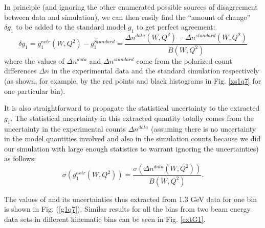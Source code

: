 



In principle (and ignoring the other enumerated possible sources of disagreement between data and simulation), we can then easily find the ``amount of change'' $\delta g_1$ to be added to the standard model $g_1$ to get perfect agreement:
\begin{equation}
\label{g1Ext}
\delta g_1 = g_1^{extr}(W,Q^2) - g_1^{Standard} = \frac{\Delta n^{data}(W,Q^2) - \Delta n^{standard}(W,Q^2)}{B(W,Q^2) }
\end{equation}
where the values of $\Delta n^{data}$ and $\Delta n^{standard}$ come from the polarized count differences $\Delta n$ in the experimental data and the standard simulation respectively (as shown, for example, by the red points and black histograms in Fig. \ref{xs1q7} for one particular \qsqs bin). %

It is also straightforward to propagate the statistical uncertainty %
to the extracted $g_1$. 
The statistical uncertainty in this extracted quantity totally comes from the uncertainty in the experimental counts $\Delta n^{data}$ (assuming there is no uncertainty in the model quantities involved and also in the simulation counts because we did our simulation with large enough statistics to warrant ignoring the uncertainties) as follows:
\begin{equation}
\label{g1ExtEr}
\sigma (g_1^{extr}(W,Q^2)) = \frac{\sigma(\Delta n^{data}(W,Q^2))}{B(W,Q^2) } .
\end{equation}

The values of \gones and its uncertainties thus extracted from 1.3 GeV data for one \qsqs bin is shown in Fig. (\ref{g1q7}). Similar results for all the bins from two beam energy data sets in different kinematic bins can be seen in Fig. \ref{extG1}.%




